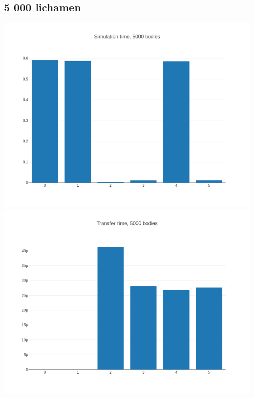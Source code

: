 \documentclass{article}
\begin{document}
\subsection{5 000 lichamen}
\includegraphics[width=\linewidth]{grafiekskes/hist_simulation5000.png}
\includegraphics[width=\linewidth]{grafiekskes/hist_transfer5000.png}
\end{document}
